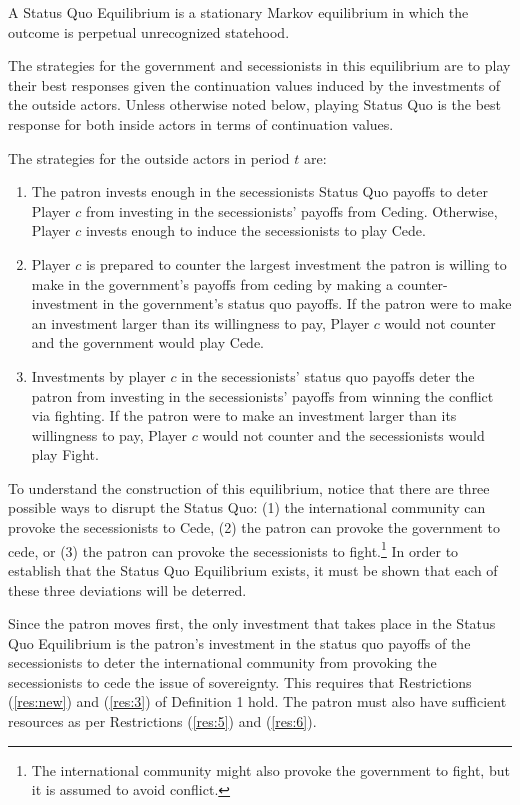 \begin{definition}
A Status Quo Equilibrium is a stationary Markov equilibrium in which the outcome is perpetual unrecognized statehood.

The strategies for the government and secessionists in this equilibrium are to play their best responses given the continuation values induced by the investments of the outside actors. Unless otherwise noted below, playing Status Quo is the best response for both inside actors in terms of continuation values.

The strategies for the outside actors in period $t$ are:

\begin{enumerate}
	\item The patron invests enough in the secessionists Status Quo payoffs to deter Player $c$ from investing in the secessionists' payoffs from Ceding. Otherwise, Player $c$ invests enough to induce the secessionists to play Cede.

	\item Player $c$ is prepared to counter the largest investment the patron is willing to make in the government's payoffs from ceding by making a counter-investment in the government's status quo payoffs. If the patron were to make an investment larger than its willingness to pay, Player $c$ would not counter and the government would play Cede.
	
	\item Investments by player $c$ in the secessionists' status quo payoffs deter the patron from investing in the secessionists' payoffs from winning the conflict via fighting. If the patron were to make an investment larger than its willingness to pay, Player $c$ would not counter and the secessionists would play Fight.
\end{enumerate}
\end{definition}

To understand the construction of this equilibrium, notice that there are three possible ways to disrupt the Status Quo: (1) the international community can provoke the secessionists to Cede, (2) the patron can provoke the government to cede, or (3) the patron can provoke the secessionists to fight.\footnote{The international community might also provoke the government to fight, but it is assumed to avoid conflict.} In order to establish that the Status Quo Equilibrium exists, it must be shown that each of these three deviations will be deterred.

Since the patron moves first, the only investment that takes place in the Status Quo Equilibrium is the patron's investment in the status quo payoffs of the secessionists to deter the international community from provoking the secessionists to cede the issue of sovereignty. This requires that Restrictions (\ref{res:new}) and (\ref{res:3}) of Definition 1 hold. The patron must also have sufficient resources as per Restrictions (\ref{res:5}) and (\ref{res:6}).

